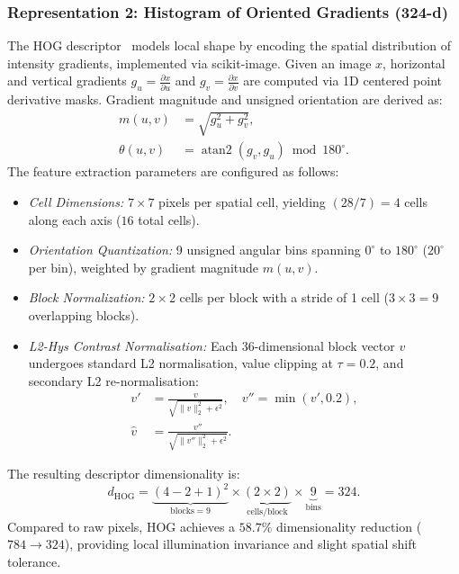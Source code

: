 \documentclass[conference]{IEEEtran}
\begin{document}
\subsubsection{Representation 2: Histogram of Oriented Gradients (324-d)}
The HOG descriptor~\cite{dalal2005hog} models local shape by encoding the
spatial distribution of intensity gradients, implemented via
scikit-image. Given an image $x$, horizontal
and vertical gradients $g_u = \frac{\partial x}{\partial u}$ and
$g_v = \frac{\partial x}{\partial v}$ are computed via 1D centered point
derivative masks. Gradient magnitude and unsigned orientation are derived as:
\begin{align}
  m(u, v) &= \sqrt{g_u^2 + g_v^2},\\
  \theta(u, v) &= \operatorname{atan2}(g_v,g_u) \bmod 180^\circ.
\end{align}
The feature extraction parameters are configured as follows:
\begin{itemize}
  \item \emph{Cell Dimensions:} $7\times 7$ pixels per spatial cell,
    yielding $(28/7) = 4$ cells along each axis ($16$ total cells).
  \item \emph{Orientation Quantization:} 9 unsigned angular bins spanning
    $0^\circ$ to $180^\circ$ ($20^\circ$ per bin), weighted by gradient
    magnitude $m(u,v)$.
  \item \emph{Block Normalization:} $2\times 2$ cells per block with a
    stride of 1 cell ($3\times 3 = 9$ overlapping blocks).
  \item \emph{L2-Hys Contrast Normalisation:} Each 36-dimensional block
    vector $v$ undergoes standard L2 normalisation, value clipping at
    $\tau = 0.2$, and secondary L2 re-normalisation:
    \begin{align}
      v' &= \frac{v}{\sqrt{\|v\|_2^2 + \epsilon^2}}, \quad
      v'' = \min(v', 0.2),\\
      \hat{v} &= \frac{v''}{\sqrt{\|v''\|_2^2 + \epsilon^2}}.
    \end{align}
\end{itemize}
The resulting descriptor dimensionality is:
\begin{equation}
  d_{\text{HOG}} = \underbrace{(4 - 2 + 1)^2}_{\text{blocks}=9} \times
  \underbrace{(2 \times 2)}_{\text{cells/block}} \times
  \underbrace{9}_{\text{bins}} = 324.
\end{equation}
Compared to raw pixels, HOG achieves a $58.7\%$ dimensionality reduction
($784 \to 324$), providing local illumination invariance and slight spatial
shift tolerance.
\end{document}
